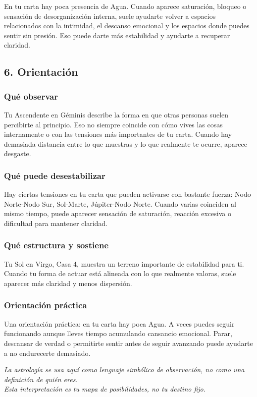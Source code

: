 \documentclass[11pt,a4paper]{article}\usepackage[utf8]{inputenc}
\begin{document}
\vspace{0.3cm}
En tu carta hay poca presencia de Agua. Cuando aparece saturación, bloqueo o sensación de desorganización interna, suele ayudarte volver a espacios relacionados con la intimidad, el descanso emocional y los espacios donde puedes sentir sin presión. Eso puede darte más estabilidad y ayudarte a recuperar claridad.

\subsection{6. Orientación}

\subsubsection*{Qué observar}
Tu Ascendente en Géminis describe la forma en que otras personas suelen percibirte al principio. Eso no siempre coincide con cómo vives las cosas internamente o con las tensiones más importantes de tu carta. Cuando hay demasiada distancia entre lo que muestras y lo que realmente te ocurre, aparece desgaste.

\subsubsection*{Qué puede desestabilizar}
Hay ciertas tensiones en tu carta que pueden activarse con bastante fuerza: Nodo Norte-Nodo Sur, Sol-Marte, Júpiter-Nodo Norte. Cuando varias coinciden al mismo tiempo, puede aparecer sensación de saturación, reacción excesiva o dificultad para mantener claridad.

\subsubsection*{Qué estructura y sostiene}
Tu Sol en Virgo, Casa 4, muestra un terreno importante de estabilidad para ti. Cuando tu forma de actuar está alineada con lo que realmente valoras, suele aparecer más claridad y menos dispersión.

\subsubsection*{Orientación práctica}
Una orientación práctica: en tu carta hay poca Agua. A veces puedes seguir funcionando aunque lleves tiempo acumulando cansancio emocional. Parar, descansar de verdad o permitirte sentir antes de seguir avanzando puede ayudarte a no endurecerte demasiado.

\vspace{1cm}
\begin{center}
{\small\itshape\color{grisai}
La astrología se usa aquí como lenguaje simbólico de observación, no como una definición de quién eres.\\
Esta interpretación es tu mapa de posibilidades, no tu destino fijo.
}
\end{center}
\end{document}
